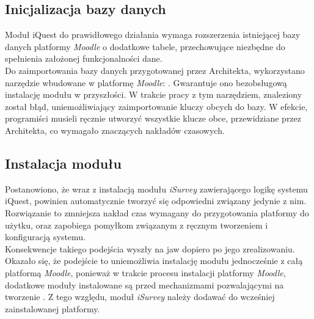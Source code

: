 \subsection{Inicjalizacja bazy danych}
\label{Chapter623}

Moduł iQuest do prawidłowego działania wymaga rozszerzenia istniejącej bazy danych platformy \textit{Moodle} o dodatkowe tabele, przechowujące niezbędne do spełnienia założonej funkcjonalności dane. \\

Do zaimportowania bazy danych przygotowanej przez Architekta, wykorzystano narzędzie wbudowane w platformę \textit{Moodle}: . Gwarantuje ono bezobsługową instalację modułu w przyszłości. W trakcie pracy z tym narzędziem, znaleziony został błąd, uniemożliwiający zaimportowanie kluczy obcych do bazy. W efekcie, programiści musieli ręcznie utworzyć wszystkie klucze obce, przewidziane przez Architekta, co wymagało znaczących nakładów czasowych.

\subsection{Instalacja modułu}
\label{Chapter624}
Postanowiono, że wraz z instalacją modułu \textit{iSurvey} zawierającego logikę systemu iQuest, powinien automatycznie tworzyć się odpowiedni  związany jedynie z nim. Rozwiązanie to zmniejsza nakład czas wymagany do przygotowania platformy do użytku, oraz zapobiega pomyłkom związanym z ręcznym tworzeniem i konfiguracją systemu. \\

Konsekwencje takiego podejścia wyszły na jaw dopiero po jego zrealizowaniu. Okazało się, że podejście to uniemożliwia instalację modułu jednocześnie z całą platformą \textit{Moodle}, ponieważ w trakcie procesu instalacji platformy \textit{Moodle}, dodatkowe moduły instalowane są przed mechanizmami pozwalającymi na tworzenie . Z tego względu, moduł \textit{iSurvey} należy dodawać do wcześniej zainstalowanej platformy.